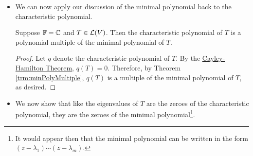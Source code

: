 \documentclass[../main.tex]{subfiles}
\begin{document}
\begin{itemize}
    \begin{theorem}\label{trm:minPolyMultiple}
        Suppose $T\in\ope{V}$ and $q\in\pol{\F}$. Then $q(T)=0$ if and only if $q$ is a polynomial multiple of the minimal polynomial of $T$.
        \begin{proof}
            Let $p$ denote the minimal polynomial of $T$.\par
            Suppose first that $q(T)=0$. By the \hyperref[trm:DivisionAlgorithmforPolynomials]{Division Algorithm for Polynomials}, we have that $q=ps+r$ where $\deg r<\deg p$. Thus,
            \begin{equation*}
                0 = q(T) = p(T)s(T)+r(T) = r(T)
            \end{equation*}
            It follows that $r=0$ (otherwise, since $\deg r<\deg p$, $r$ divided by the coefficient of the highest-order term would be a monic polynomial that when applied to $T$ of degree less than minimal polynomial, a contradiction). Therefore, $q$ is a polynomial multiple of the minimal polynomial of $T$, as desired.\par
            Now suppose that $q$ is a polynomial multiple of the minimal polynomial of $T$. The $q=ps$ for some $s\in\pol{\F}$. It follows that
            \begin{equation*}
                q(T) = p(T)s(T) = 0s(T) = 0
            \end{equation*}
            as desired.
        \end{proof}
    \end{theorem}
    \item We can now apply our discussion of the minimal polynomial back to the characteristic polynomial.
    \begin{theorem}
        Suppose $\mathbb{F}=\mathbb{C}$ and $T\in\ope{V}$. Then the characteristic polynomial of $T$ is a polynomial multiple of the minimal polynomial of $T$.
        \begin{proof}
            Let $q$ denote the characteristic polynomial of $T$. By the \hyperref[trm:CayleyHamilton]{Cayley-Hamilton Theorem}, $q(T)=0$. Therefore, by Theorem \ref{trm:minPolyMultiple}, $q(T)$ is a multiple of the minimal polynomial of $T$, as desired.
        \end{proof}
    \end{theorem}
    \item We now show that like the eigenvalues of $T$ are the zeroes of the characteristic polynomial, they are the zeroes of the minimal polynomial\footnote{It would appear then that the minimal polynomial can be written in the form $(z-\lambda_1)\cdots(z-\lambda_m)$.}.

\end{itemize}
\end{document}
